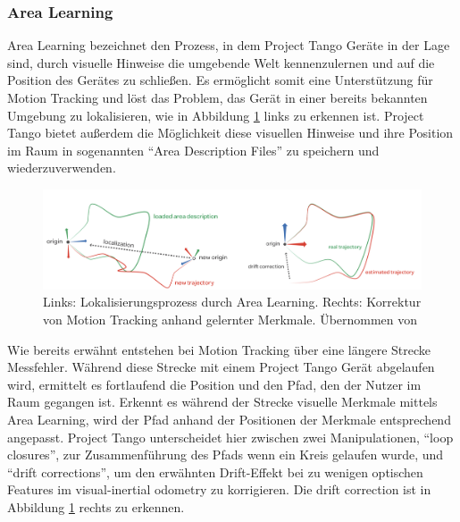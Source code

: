 \subsubsection{Area Learning} \label{subsec:area-learning}

Area Learning bezeichnet den Prozess, in dem Project Tango Geräte in der Lage sind, durch visuelle Hinweise die umgebende Welt kennenzulernen und auf die Position des Gerätes zu schließen. 
Es ermöglicht somit eine Unterstützung für Motion Tracking und löst das Problem, das Gerät in einer bereits bekannten Umgebung zu lokalisieren, wie in Abbildung \ref{fig:area-learning} links zu erkennen ist.
Project Tango bietet außerdem die Möglichkeit diese visuellen Hinweise und ihre Position im Raum in sogenannten \enquote{Area Description Files} zu speichern und wiederzuverwenden. \citep{GoogleDevelopersConcepts:online}

\begin{figure}[h]
  \centering
	\includegraphics[width=1.0\textwidth]{content/images/theory/tango-area-learning.png} 
  \caption{Links: Lokalisierungsprozess durch Area Learning. Rechts: Korrektur von Motion Tracking anhand gelernter Merkmale. Übernommen von \citet{GoogleDevelopers:online}}
  \label{fig:area-learning}
\end{figure}

Wie bereits erwähnt entstehen bei Motion Tracking über eine längere Strecke Messfehler. 
Während diese Strecke mit einem Project Tango Gerät abgelaufen wird, ermittelt es fortlaufend die Position und den Pfad, den der Nutzer im Raum gegangen ist. 
Erkennt es während der Strecke visuelle Merkmale mittels Area Learning, wird der Pfad anhand der Positionen der Merkmale entsprechend angepasst. 
Project Tango unterscheidet hier zwischen zwei Manipulationen, \enquote{loop closures}, zur Zusammenführung des Pfads wenn ein Kreis gelaufen wurde, und \enquote{drift corrections}, um den erwähnten Drift-Effekt bei zu wenigen optischen Features im visual-inertial odometry zu korrigieren. 
Die drift correction ist in Abbildung \ref{fig:area-learning} rechts zu erkennen. \citep{GoogleDevelopersConcepts:online} 

